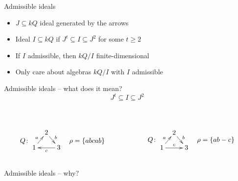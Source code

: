 \begin{frame}{Admissible ideals}
\begin{itemize}
\item $J \subseteq kQ$ ideal generated by the arrows
\item Ideal $I \subseteq kQ$  if $J^t \subseteq I
\subseteq J^2$ for some $t \ge 2$
\item If $I$ admissible, then $kQ/I$ finite-dimensional
\item Only care about algebras $kQ/I$ with $I$ admissible
\end{itemize}
\end{frame}


\begin{frame}{Admissible ideals -- what does it mean?}{}
{\huge
\[
J^t \subseteq I \subseteq J^2
\]
}
\pause
\vspace{-1em}
\begin{columns}
\begin{column}{.5\textwidth}
\\
\color{OliveGreen}
\[
Q\colon
\vcenter{\xymatrix@R=1em@C=.7em{
& 2 \ar[dr]^b \\
1 \ar[ur]^a &&
3 \ar[ll]^c
}}
\quad
\rho = \{ abcab \}
\]
\end{column}
\begin{column}{.5\textwidth}
\pause
\\
\color{red}
\[
Q\colon
\vcenter{\xymatrix@R=1em@C=.7em{
& 2 \ar[dr]^b \\
1 \ar[ur]^a \ar[rr]^c &&
3
}}
\quad
\rho = \{ ab - c \}
\]
\end{column}
\end{columns}
\end{frame}


\begin{frame}{Admissible ideals -- why?}

\end{frame}


